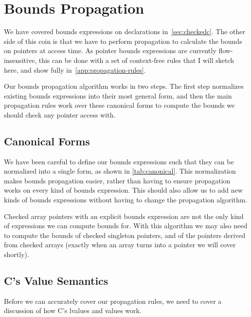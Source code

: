 \chapter{Bounds Propagation}
\label{sec:propagation}

We have covered bounds expressions on declarations
in~\autoref{sec:checkedc}. The other side of this coin is that we have
to perform propagation to calculate the bounds on pointers at access
time. As pointer bounds expressions are currently flow-insensitive,
this can be done with a set of context-free rules that I will sketch
here, and show fully in~\autoref{app:propagation-rules}.

Our bounds propagation algorithm works in two steps. The first step
normalizes existing bounds expressions into their most general form,
and then the main propagation rules work over these canonical forms to
compute the bounds we should check any pointer access with.

\section{Canonical Forms}
\label{sec:canonical-forms}

We have been careful to define our bounds expressions such that they
can be normalized into a single form, as shown in
\autoref{tab:canonical}. This normalization makes bounds propagation
easier, rather than having to ensure propagation works on every kind
of bounds expression. This should also allow us to add new kinds of
bounds expressions without having to change the propagation algorithm.

Checked array pointers with an explicit bounds expression are not the
only kind of expressions we can compute bounds for. With this
algorithm we may also need to compute the bounds of checked singleton
pointers, and of the pointers derived from checked arrays (exactly
when an array turns into a pointer we will cover shortly).

\begin{table}[ht]

\end{table}

\section{C's Value Semantics}
\label{sec:cs-value-semantics}

Before we can accurately cover our propagation rules, we need to cover
a discussion of how C's lvalues and values work.

